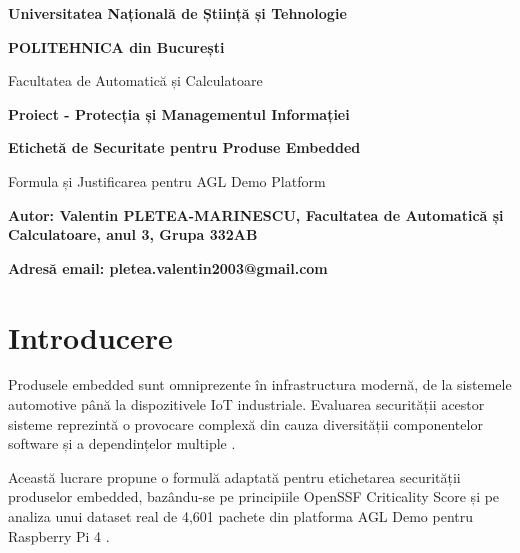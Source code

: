 \documentclass[12pt,a4paper]{article}
\begin{document}
\begin{titlepage}
    \centering
    \vspace{1cm}
    
    {\Large\bfseries\centering Universitatea Națională de Știință și Tehnologie}
    
    {\large\bfseries\centering POLITEHNICA din București}
    
    {\large\centering Facultatea de Automatică și Calculatoare}
        
    \vspace{3cm}
    
    {\Large\bfseries\centering Proiect - Protecția și Managementul Informației}

    \vspace{2cm}
    
    {\LARGE\bfseries\centering Etichetă de Securitate pentru Produse Embedded\\[1cm]}
    
    {\large\centering Formula și Justificarea pentru AGL Demo Platform}

    \vspace{\fill}
    
    \raggedright
    {\large\bfseries Autor: Valentin PLETEA-MARINESCU, Facultatea de Automatică și
    Calculatoare, anul 3, Grupa 332AB \par}
    {\large\bfseries Adresă email: pletea.valentin2003@gmail.com \par}
    
    \vspace{1cm}
    
\end{titlepage}

\hypersetup{
    colorlinks=false,
    linkcolor=black,
    filecolor=black,      
    urlcolor=black,
    hidelinks
}
\tableofcontents
\newpage

\section{Introducere}

Produsele embedded sunt omniprezente în infrastructura modernă, de la sistemele automotive până la dispozitivele IoT industriale. Evaluarea securității acestor sisteme reprezintă o provocare complexă din cauza diversității componentelor software și a dependințelor multiple \cite{nguyen2020security,cui2013embedded}.

Această lucrare propune o formulă adaptată pentru etichetarea securității produselor embedded, bazându-se pe principiile OpenSSF Criticality Score \cite{openssf2021criticality,openssf2021criticality_web,pike_github} și pe analiza unui dataset real de 4,601 pachete din platforma AGL Demo pentru Raspberry Pi 4 \cite{agl_website}.
\end{document}
